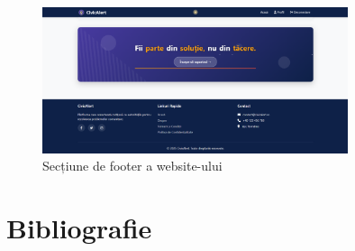 \documentclass[12pt,a4paper]{report}
\begin{document}
\begin{figure}[H]
    \centering
    \includegraphics[width=0.8\textwidth]{end.png}
    \caption{Secțiune de footer a website-ului}
    \label{fig:end}
\end{figure}

\newpage

\chapter{Bibliografie}
\end{document}
